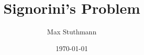 \documentclass[11pt,a4paper]{article}
\begin{document}
\title{Signorini's Problem}
\author{Max Stuthmann}
\date{\today}
\maketitle
\tableofcontents


\newpage

\newpage

\newpage
%

\newpage


\newpage
\renewcommand{\thesection}{\Alph{section}}
\setcounter{page}{1}
\setcounter{section}{0}


\listoffigures
\end{document}

